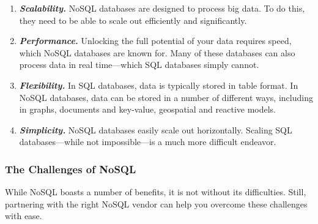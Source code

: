 \documentclass[
	final,
	a4paper,
	oneside,
	parskip=half,
	headings=standardclasses,
	headings=big,
	pointednumbers,
    fleqn
]{scrartcl}
\newcommand{\brand}[1]{\textbf{\textit{#1}}}
\begin{document}
\begin{multicols*}{2}
                \begin{enumerate}
                    \item{
                        \brand{Scalability.} NoSQL databases are designed to process big data. To do this, they need to be able to scale out efficiently and significantly.
                    }
                    \item{
                        \brand{Performance.} Unlocking the full potential of your data requires speed, which NoSQL databases are known for. Many of these databases can also process data in real time—which SQL databases simply cannot.
                    }
                    \item{
                        \brand{Flexibility.} In SQL databases, data is typically stored in table format. In NoSQL databases, data can be stored in a number of different ways, including in graphs, documents and key-value, geospatial and reactive models.
                    }
                    \item{
                        \brand{Simplicity.} NoSQL databases easily scale out horizontally. Scaling SQL databases—while not impossible—is a much more difficult endeavor.
                    }
                \end{enumerate}

            \subsubsection{The Challenges of NoSQL}

                While NoSQL boasts a number of benefits, it is not without its difficulties. Still, partnering with the right NoSQL vendor can help you overcome these challenges with ease.



\end{multicols*}
\end{document}

